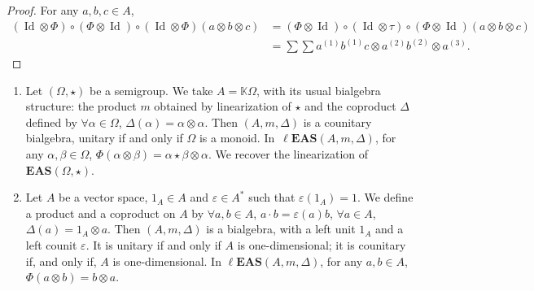 \documentclass[pdftex]{sigma}
\numberwithin{equation}{section}
\newcommand{\eas}{\mathbf{EAS}}
\newcommand{\leas}{\ell\mathbf{EAS}}
\begin{document}
\begin{proof}
For any $a,b,c\in A$,
\begin{align*}
(\operatorname{Id} \otimes \Phi)\circ(\Phi\otimes \operatorname{Id})\circ (\operatorname{Id} \otimes \Phi)(a\otimes b\otimes c)&=(\Phi\otimes \operatorname{Id})\circ (\operatorname{Id} \otimes \tau)\circ (\Phi \otimes \operatorname{Id})(a\otimes b\otimes c)\\
&=\sum \sum a^{(1)}b^{(1)}c\otimes a^{(2)}b^{(2)}\otimes a^{(3)}. \tag*{\qed}
\end{align*} \renewcommand{\qed}{}\end{proof}

\begin{Example}\quad\samepage
\begin{enumerate}\itemsep=0pt
\item[(1)] Let $(\Omega,\star)$ be a semigroup. We take $A=\mathbb{K}\Omega$, with its usual bialgebra structure: the product $m$ obtained by linearization of $\star$ and the coproduct $\Delta$ defined by
$\forall \alpha \in \Omega$, $\Delta(\alpha) =\alpha \otimes \alpha$.
Then $(A,m,\Delta)$ is a counitary bialgebra, unitary if and only if $\Omega$ is a monoid. In~$\leas(A,m,\Delta)$, for any $\alpha,\beta \in \Omega$,
$\Phi(\alpha \otimes \beta)=\alpha\star \beta \otimes \alpha$.
We recover the linearization of $\eas(\Omega,\star)$.
\item[(2)] Let $A$ be a vector space, $1_A\in A$ and $\varepsilon\in A^*$ such that $\varepsilon(1_A)=1$. We define a product and a coproduct on $A$ by
$
\forall a,b\in A$, $ a\cdot b =\varepsilon(a) b$, $
\forall a\in A$, $ \Delta(a) =1_A\otimes a$.
Then $(A,m,\Delta)$ is a bialgebra, with a left unit $1_A$ and a left counit $\varepsilon$. It is unitary if and only if $A$ is one-dimensional; it is counitary if, and only if, $A$ is one-dimensional. In $\leas(A,m,\Delta)$, for any $a,b\in A$, $\Phi(a\otimes b)=b\otimes a$.
\end{enumerate}\end{Example}
\end{document}
